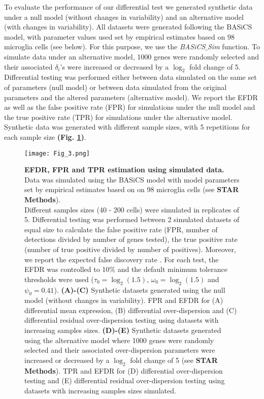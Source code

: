 To evaluate the performance of our differential test we generated synthetic data under a null model (without changes in variability) and an alternative model (with changes in variability). All datasets were generated following the BASiCS model, with parameter values used set by empirical estimates based on 98 microglia cells (see below). For this purpose, we use the \emph{BASiCS$\_$Sim} function. To simulate data under an alternative model, 1000 genes were randomly selected and their associated $\delta_i$'s were increased or decreased by a $\log_2$ fold change of 5. Differential testing was performed either between data simulated on the same set of parameters (null model) or between data simulated from the original parameters and the altered parameters (alternative model). We report the EFDR \citep{Newton2004} as well as the false positive rate (FPR) for simulations under the null model and the true positive rate (TPR) for simulations under the alternative model. Synthetic data was generated with different sample sizes, with 5 repetitions for each sample size \textbf{(Fig. \ref{fig2:EFDR})}.

\begin{figure}[!h]
\centering
\texttt{[image: Fig\_3.png]}
\caption[EFDR, FPR and TPR estimation using simulated data.]{\textbf{EFDR, FPR and TPR estimation using simulated data.}\\
Data was simulated using the BASiCS model with model parameters set by empirical estimates based on on 98 microglia cells (see \textbf{STAR Methods}).  \\
Different samples sizes (40 - 200 cells) were simulated in replicates of 5. Differential testing was performed between 2 simulated datasets of equal size to calculate the false positive rate (FPR, number of detections divided by number of genes tested), the true positive rate (number of true positive divided by number of positives). Moreover, we report the expected false discovery rate \citep[EFDR,][]{Newton2004}. 
For each test, the EFDR was controlled to 10\% and the default minimum tolerance thresholds were used ($\tau_0 = \log_2(1.5)$, $\omega_0 = \log_2(1.5)$ and $\psi_0 = 0.41$). \textbf{(A)-(C)} Synthetic datasets generated using the null model (without changes in variability). FPR and EFDR for (A) differential mean expression, (B) differential over-dispersion and (C) differential residual over-dispersion testing using datasets with increasing samples sizes. \textbf{(D)-(E)} Synthetic datasets generated using the alternative model where 1000 genes were randomly selected and their associated over-dispersion parameters were increased or decreased by a $\log_2$ fold change of 5 (see \textbf{STAR Methods}). TPR and EFDR for (D) differential over-dispersion testing and (E) differential residual over-dispersion testing using datasets with increasing samples sizes simulated.\\
}\label{fig2:EFDR}
\end{figure}

